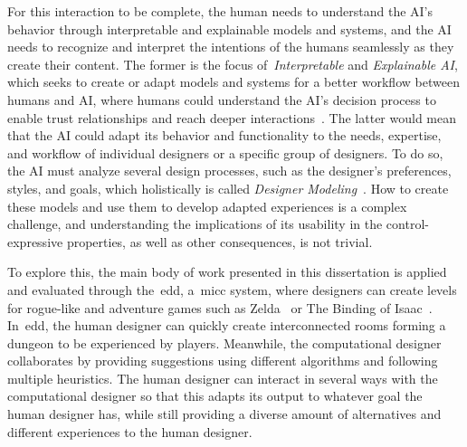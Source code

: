 For this interaction to be complete, the human needs to understand the AI's behavior through interpretable and explainable models and systems, and the AI needs to recognize and interpret the intentions of the humans seamlessly as they create their content. The former is the focus of~\emph{Interpretable} and \emph{Explainable AI}, which seeks to create or adapt models and systems for a better workflow between humans and AI, where humans could understand the AI's decision process to enable trust relationships and reach deeper interactions~\cite{zhu_explainable_2018,doshi-velez_considerations_2018,adadi_peeking_2018}. The latter would mean that the AI could adapt its behavior and functionality to the needs, expertise, and workflow of individual designers or a specific group of designers. To do so, the AI must analyze several design processes, such as the designer's preferences, styles, and goals, which holistically is called \emph{Designer Modeling}~\cite{liapis_designer_2013,liapis_designer_2014}. How to create these models and use them to develop adapted experiences is a complex challenge, and understanding the implications of its usability in the control-expressive properties, as well as other consequences, is not trivial.

To explore this, the main body of work presented in this dissertation is applied and evaluated through the~\acrfull{edd}, a~\acrlong{micc} system, where designers can create levels for rogue-like and adventure games such as Zelda~\cite{tloz} or The Binding of Isaac~\cite{bindingISAAC}. In~\acrshort{edd}, the human designer can quickly create interconnected rooms forming a dungeon to be experienced by players. Meanwhile, the computational designer collaborates by providing suggestions using different algorithms and following multiple heuristics. The human designer can interact in several ways with the computational designer so that this adapts its output to whatever goal the human designer has, while still providing a diverse amount of alternatives and different experiences to the human designer.

